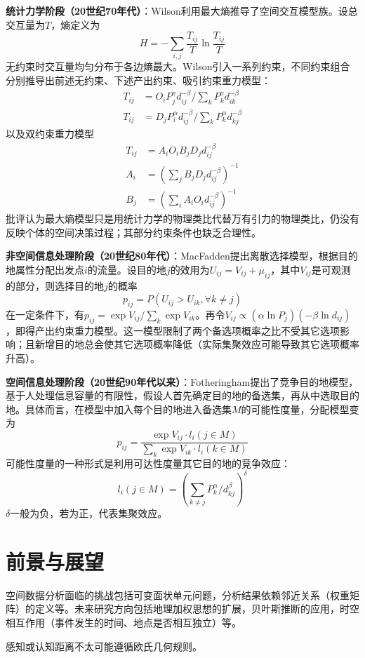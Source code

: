 \par \textbf{统计力学阶段（20世纪70年代）}：Wilson利用最大熵推导了空间交互模型族。设总交互量为$T$，熵定义为
\begin{equation}
    H=-\sum_{i,j}{\frac{T_{ij}}{T}\ln\frac{T_{ij}}{T}}
\end{equation}
无约束时交互量均匀分布于各边熵最大。Wilson引入一系列约束，不同约束组合分别推导出前述无约束、下述产出约束、吸引约束重力模型：
\begin{align}
    T_{ij}&=O_i P_j^{\gamma}d_{ij}^{-\beta}/\sum_k P_k^{\gamma}d_{ik}^{-\beta}\\
    T_{ij}&=D_j P_i^{\alpha}d_{ij}^{-\beta}/\sum_k P_k^{\alpha}d_{kj}^{-\beta}
\end{align}
以及双约束重力模型
\begin{align}
    T_{ij}&=A_iO_iB_jD_jd_{ij}^{-\beta}\\
    A_i &= \left(\sum_j B_jD_jd_{ij}^{-\beta}\right)^{-1}\\
    B_j &= \left(\sum_i A_iO_id_{ij}^{-\beta}\right)^{-1}
\end{align}
批评认为最大熵模型只是用统计力学的物理类比代替万有引力的物理类比，仍没有反映个体的空间决策过程；其部分约束条件也缺乏合理性。

\par \textbf{非空间信息处理阶段（20世纪80年代）}：MacFadden提出离散选择模型，根据目的地属性分配出发点$i$的流量。设目的地$j$的效用为$U_{ij}=V_{ij}+\mu_{ij}$，其中$V_{ij}$是可观测的部分，则选择目的地$j$的概率
\begin{equation}
    p_{ij}=P(U_{ij}>U_{ik}, \forall k \neq j)
\end{equation}
在一定条件下，有$p_{ij}=\exp{V_{ij}}/\sum_k \exp{V_{ik}}$。再令$V_{ij}\propto (\alpha \ln P_j)(-\beta \ln d_{ij})$，即得产出约束重力模型。这一模型限制了两个备选项概率之比不受其它选项影响；且新增目的地总会使其它选项概率降低（实际集聚效应可能导致其它选项概率升高）。

\par \textbf{空间信息处理阶段（20世纪90年代以来）}：Fotheringham提出了竞争目的地模型，基于人处理信息容量的有限性，假设人首先确定目的地的备选集，再从中选取目的地。具体而言，在模型中加入每个目的地进入备选集$M$的可能性度量，分配模型变为\begin{equation}
    p_{ij}=\frac{\exp{V_{ij}} \cdot l_i(j\in M)}{\sum_k \exp{V_{ik}} \cdot l_i(k\in M)}
\end{equation}
可能性度量的一种形式是利用可达性度量其它目的地的竞争效应：
\begin{equation}
    l_i(j\in M)= \left(\sum_{k\neq j}P_k^\alpha/d_{kj}^\beta\right)^\delta
\end{equation}
$\delta$一般为负，若为正，代表集聚效应。

\section{前景与展望}

\par 空间数据分析面临的挑战包括可变面状单元问题，分析结果依赖邻近关系（权重矩阵）的定义等。未来研究方向包括地理加权思想的扩展，贝叶斯推断的应用，时空相互作用（事件发生的时间、地点是否相互独立）等。

\par 感知或认知距离不太可能遵循欧氏几何规则。

